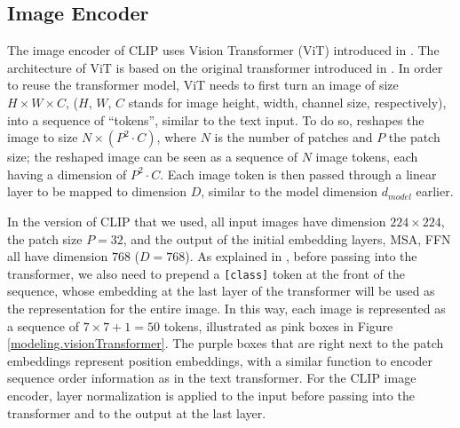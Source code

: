 \subsection{Image Encoder} \label{clip.image.encoder}
The image encoder of CLIP uses Vision Transformer (ViT) introduced in \cite{ViT}. The architecture of ViT is based on the original transformer introduced in \cite{attentionAllYouNeed}. 
In order to reuse the transformer model, ViT needs to first turn an image of size $H\times W \times C$, ($H$, $W$, $C$ stands for image height, width, channel size, respectively), into a sequence of ``tokens'', similar to the text input.  
To do so, \cite{ViT} reshapes the image to size $N \times (P^2 \cdot C)$, where $N$ is the number of patches and $P$ the patch size; the reshaped image can be seen as a sequence of $N$ image tokens, each having a dimension of $P^2 \cdot C$. Each image token is then passed through a linear layer to be mapped to dimension $D$, similar to the model dimension $d_{model}$ earlier. 

In the version of CLIP that we used, all input images have dimension $224\times 224$, the patch size $P = 32$, and the output of the initial embedding layers, MSA, FFN all have dimension $768$ ($D = 768$). 
As explained in \cite{ViT}, before passing into the transformer, we also need to prepend a \texttt{[class]} token at the front of the sequence, whose embedding at the last layer of the transformer will be used as the representation for the entire image. In this way, each image is represented as a sequence of $7\times 7 + 1 = 50$ tokens, illustrated as pink boxes in Figure \ref{modeling.visionTransformer}. The purple boxes that are right next to the patch embeddings represent position embeddings, with a similar function to encoder sequence order information as in the text transformer. 
For the CLIP image encoder, layer normalization is applied to the input before passing into the transformer and to the output at the last layer.
 

